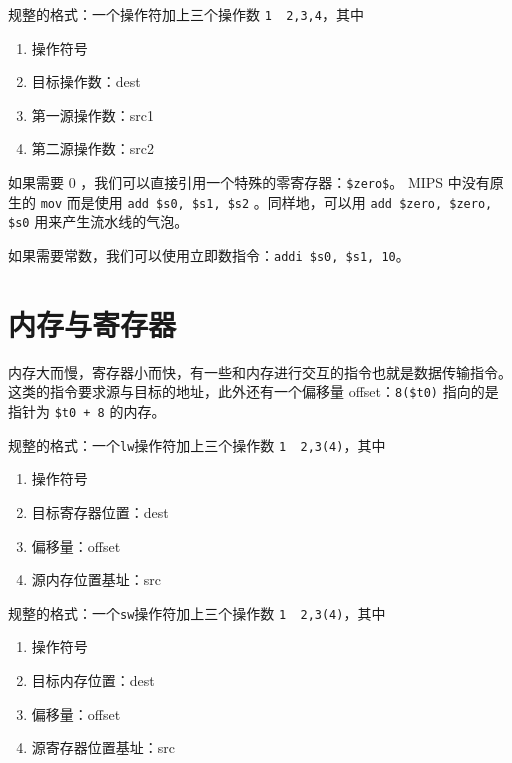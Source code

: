 \documentclass[cn,11pt,chinese,black,simple]{../elegantbook}
\begin{document}
规整的格式：一个操作符加上三个操作数 \lstinline{1  2,3,4}，其中

\begin{enumerate}
    \item 操作符号
    \item 目标操作数：dest
    \item 第一源操作数：src1
    \item 第二源操作数：src2
\end{enumerate}

如果需要 0 ，我们可以直接引用一个特殊的零寄存器：\lstinline{$zero$}。 MIPS 中没有原生的 \lstinline{mov} 而是使用 \lstinline{add $s0, $s1, $s2} 。同样地，可以用 \lstinline{add $zero, $zero, $s0} 用来产生流水线的气泡。

如果需要常数，我们可以使用立即数指令：\lstinline{addi $s0, $s1, 10}。

\section{内存与寄存器}

内存大而慢，寄存器小而快，有一些和内存进行交互的指令也就是数据传输指令。这类的指令要求源与目标的地址，此外还有一个偏移量 offset：\lstinline{8($t0)} 指向的是指针为 \lstinline{$t0 + 8} 的内存。


规整的格式：一个\lstinline{lw}操作符加上三个操作数 \lstinline{1  2,3(4)}，其中

\begin{enumerate}
    \item 操作符号
    \item 目标寄存器位置：dest
    \item 偏移量：offset
    \item 源内存位置基址：src
\end{enumerate}


规整的格式：一个\lstinline{sw}操作符加上三个操作数 \lstinline{1  2,3(4)}，其中

\begin{enumerate}
    \item 操作符号
    \item 目标内存位置：dest
    \item 偏移量：offset
    \item 源寄存器位置基址：src
\end{enumerate}



\let\chapname\undefined
\ifx\mainclass\undefined
\end{document}
